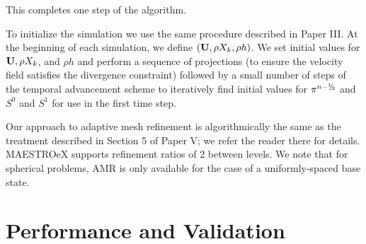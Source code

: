 \documentclass{aastex62}
\newcommand{\sfrac}[2]{\mathchoice
  {\kern0em\raise.5ex\hbox{\the\scriptfont0 #1}\kern-.15em/
   \kern-.15em\lower.25ex\hbox{\the\scriptfont0 #2}}
  {\kern0em\raise.5ex\hbox{\the\scriptfont0 #1}\kern-.15em/
   \kern-.15em\lower.25ex\hbox{\the\scriptfont0 #2}}
  {\kern0em\raise.5ex\hbox{\the\scriptscriptfont0 #1}\kern-.2em/
   \kern-.15em\lower.25ex\hbox{\the\scriptscriptfont0 #2}}
  {#1\!/#2}}
\newcommand{\myhalf}{\sfrac{1}{2}}
\newcommand{\Ub}{{\bf{U}}}
\begin{document}
This completes one step of the algorithm.

To initialize the simulation we use the same procedure described in Paper III.
At the beginning of each simulation, we define $(\Ub,\rho X_k,\rho h)$.
We set initial values for $\Ub, \rho X_k$, and $\rho h$ and perform a sequence of projections 
(to ensure the velocity field satisfies the divergence constraint) 
followed by a small number of steps of the temporal advancement scheme to iteratively 
find initial values for $\pi^{n-\myhalf}$ and $S^0$ and $S^1$ for use in the first time step.

Our approach to adaptive mesh refinement is algorithmically the same as the treatment described 
in Section 5 of Paper V; we refer the reader there for details.
MAESTROeX supports refinement ratios of 2 between levels.
We note that for spherical problems, AMR is only available for the case of a uniformly-spaced base state.


\section{Performance and Validation}\label{sec:results}
\end{document}
